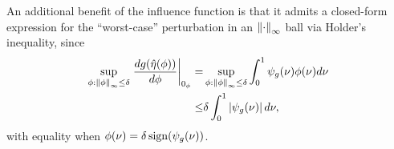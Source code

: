 An additional benefit of the influence function is that it admits a closed-form
expression for the ``worst-case'' perturbation in an $\left\Vert\cdot\right\Vert_{\infty}$ ball
via Holder's inequality, since
%
\begin{align*}
%
\sup_{\phi: \norminf{\phi} \le \delta}
    \fracat{d g(\etaopt(\phi))}{d \phi}{\phiz} =&{}
\sup_{\phi: \norminf{\phi} \le \delta}
    \int_0^1 \inflg(\nu) \phi(\nu) d\nu \\
\le&{} \delta \int_0^1 \abs{\inflg(\nu) }d\nu,
%
\end{align*}
%
with equality when $\phi(\nu) = \delta \, \mathrm{sign}(\psi_{g}(\nu))$.



%
